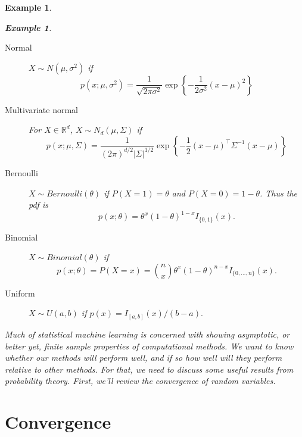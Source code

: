 \documentclass[10pt]{article}
\newtheorem{example}[ex]{Example}
\newcommand{\R}{\mathbb{R}}
\begin{document}
\begin{example}
\begin{example}
\begin{description}
\item[Normal] $X\sim N(\mu,\sigma^2)$ if
  \begin{equation}
    \label{eq:7}
    p(x;\mu,\sigma^2) =
    \frac{1}{\sqrt{2\pi\sigma^2}}\exp\left\{-\frac{1}{2\sigma^2}(x-\mu)^2\right\} 
  \end{equation}
\item[Multivariate normal] For $X\in \R^d$, $X\sim N_d(\mu, \Sigma)$ if
  \begin{equation}
    \label{eq:15}
    p(x;\mu,\Sigma) = \frac{1}{(2\pi)^{d/2}|\Sigma|^{1/2}}\exp\left\{-\frac{1}{2}(x-\mu)^\top\Sigma^{-1}(x-\mu)\right\} 
  \end{equation}
\item[Bernoulli] $X\sim Bernoulli(\theta)$ if $P(X=1)=\theta$ and
  $P(X=0) = 1-\theta$. Thus the pdf is
  \begin{equation}
    \label{eq:16}
    p(x;\theta) = \theta^x(1-\theta)^{1-x} I_{\{0,1\}}(x).
  \end{equation}
\item[Binomial] $X\sim Binomial(\theta)$ if
  \begin{equation}
    \label{eq:17}
    p(x;\theta) = P(X=x) = \binom{n}{x}\theta^x(1-\theta)^{n-x}I_{\{0,\ldots,n\}}(x).
  \end{equation}
\item[Uniform] $X\sim U(a,b)$ if $p(x) = I_{[a,b]}(x)/(b-a).$
\end{description}


Much of statistical machine learning is concerned with showing
asymptotic, or better yet, finite sample properties of computational
methods. We want to know whether our methods will perform well, and if
so how well will they perform relative to other methods. For that, we
need to discuss some useful results from probability theory. First,
we'll review the convergence of random variables.

\section{Convergence}
\label{sec:convergence}


\end{example}
\end{example}
\end{document}
